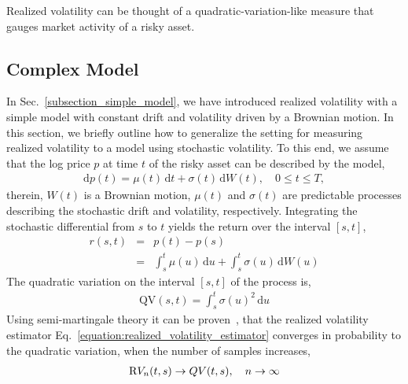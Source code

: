 \documentclass[11pt, a4paper]{thesis}  %
\newcommand{\dd}{\textrm{d}}
\begin{document}
Realized volatility can be thought of a quadratic-variation-like measure that gauges market activity of a risky asset.
 
%
%
%
\subsection{Complex Model}
%
In Sec.~\ref{subsection_simple_model}, we have introduced realized volatility with a simple model with constant drift and volatility driven by a Brownian motion. In this section, we briefly outline how to  generalize the setting for measuring realized volatility to a model using stochastic volatility. To this end, we assume that the log price $p$ at time $t$ of the risky asset can be described by the model,
%
\begin{eqnarray}
	\dd p(t) = \mu(t)\,\dd t + \sigma(t)\,\dd W(t),\quad 0 \le t \le T,
	\label{complex_model_log_price}
\end{eqnarray}
%
therein, $W(t)$ is a Brownian motion, $\mu(t)$ and $\sigma(t)$ are predictable processes describing the stochastic drift and volatility, respectively. Integrating the stochastic differential from $s$ to $t$ yields the return over the interval $\left[s, t\right]$,
%
\begin{eqnarray}
	r\left(s,t\right) 
	&=& p\left(t\right) - p\left(s\right)
	\\\nonumber
	&=& \int_{s}^{t}\mu(u)\,\dd u + \int_{s}^{t}\sigma(u)\,\dd W(u)
\end{eqnarray}
%
The quadratic variation on the interval $[s,t]$ of the process is, 
%
\begin{eqnarray}
	\textrm{QV}(s,t) = \int_s^t \sigma(u)^2\,\dd u
\end{eqnarray}
%
Using semi-martingale theory it can be proven~\cite{Andersen:2008:realized_vol, Barndorff:2002:Estimating_QV}, that the realized volatility estimator Eq.~\ref{equation:realized_volatility_estimator} converges in probability to the quadratic variation, when the number of samples increases, 
%
\begin{eqnarray}
	\textrm RV_n(t,s) \rightarrow QV(t,s),\quad n\rightarrow\infty
\end{eqnarray}
%
\end{document}
